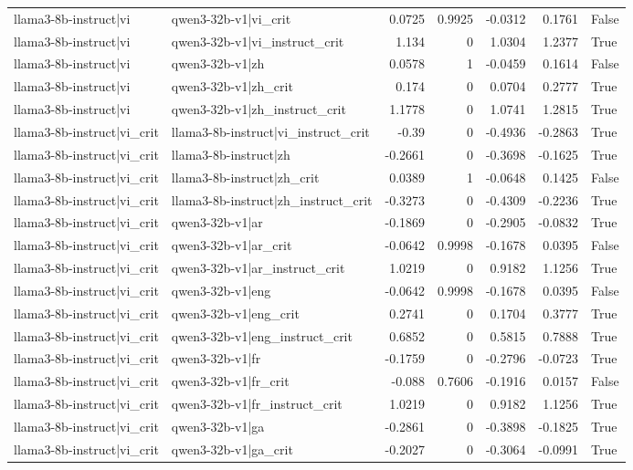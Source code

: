 \begin{table}
\begin{tabular}{l l r r r r l}
llama3-8b-instruct|vi & qwen3-32b-v1|vi_crit & 0.0725 & 0.9925 & -0.0312 & 0.1761 & False \\
llama3-8b-instruct|vi & qwen3-32b-v1|vi_instruct_crit & 1.134 & 0 & 1.0304 & 1.2377 & True \\
llama3-8b-instruct|vi & qwen3-32b-v1|zh & 0.0578 & 1 & -0.0459 & 0.1614 & False \\
llama3-8b-instruct|vi & qwen3-32b-v1|zh_crit & 0.174 & 0 & 0.0704 & 0.2777 & True \\
llama3-8b-instruct|vi & qwen3-32b-v1|zh_instruct_crit & 1.1778 & 0 & 1.0741 & 1.2815 & True \\
llama3-8b-instruct|vi_crit & llama3-8b-instruct|vi_instruct_crit & -0.39 & 0 & -0.4936 & -0.2863 & True \\
llama3-8b-instruct|vi_crit & llama3-8b-instruct|zh & -0.2661 & 0 & -0.3698 & -0.1625 & True \\
llama3-8b-instruct|vi_crit & llama3-8b-instruct|zh_crit & 0.0389 & 1 & -0.0648 & 0.1425 & False \\
llama3-8b-instruct|vi_crit & llama3-8b-instruct|zh_instruct_crit & -0.3273 & 0 & -0.4309 & -0.2236 & True \\
llama3-8b-instruct|vi_crit & qwen3-32b-v1|ar & -0.1869 & 0 & -0.2905 & -0.0832 & True \\
llama3-8b-instruct|vi_crit & qwen3-32b-v1|ar_crit & -0.0642 & 0.9998 & -0.1678 & 0.0395 & False \\
llama3-8b-instruct|vi_crit & qwen3-32b-v1|ar_instruct_crit & 1.0219 & 0 & 0.9182 & 1.1256 & True \\
llama3-8b-instruct|vi_crit & qwen3-32b-v1|eng & -0.0642 & 0.9998 & -0.1678 & 0.0395 & False \\
llama3-8b-instruct|vi_crit & qwen3-32b-v1|eng_crit & 0.2741 & 0 & 0.1704 & 0.3777 & True \\
llama3-8b-instruct|vi_crit & qwen3-32b-v1|eng_instruct_crit & 0.6852 & 0 & 0.5815 & 0.7888 & True \\
llama3-8b-instruct|vi_crit & qwen3-32b-v1|fr & -0.1759 & 0 & -0.2796 & -0.0723 & True \\
llama3-8b-instruct|vi_crit & qwen3-32b-v1|fr_crit & -0.088 & 0.7606 & -0.1916 & 0.0157 & False \\
llama3-8b-instruct|vi_crit & qwen3-32b-v1|fr_instruct_crit & 1.0219 & 0 & 0.9182 & 1.1256 & True \\
llama3-8b-instruct|vi_crit & qwen3-32b-v1|ga & -0.2861 & 0 & -0.3898 & -0.1825 & True \\
llama3-8b-instruct|vi_crit & qwen3-32b-v1|ga_crit & -0.2027 & 0 & -0.3064 & -0.0991 & True \\

\end{tabular}
\end{table}
